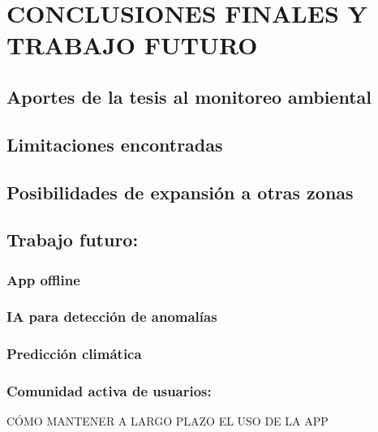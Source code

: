 \chapter{CONCLUSIONES FINALES Y TRABAJO FUTURO}



\section{Aportes de la tesis al monitoreo ambiental}
\section{Limitaciones encontradas}
\section{Posibilidades de expansión a otras zonas}
\section{Trabajo futuro:}

\subsection{App offline}
\subsection{IA para detección de anomalías}
\subsection{Predicción climática}
\subsection{Comunidad activa de usuarios:} 








CÓMO MANTENER A LARGO PLAZO EL USO DE LA APP










